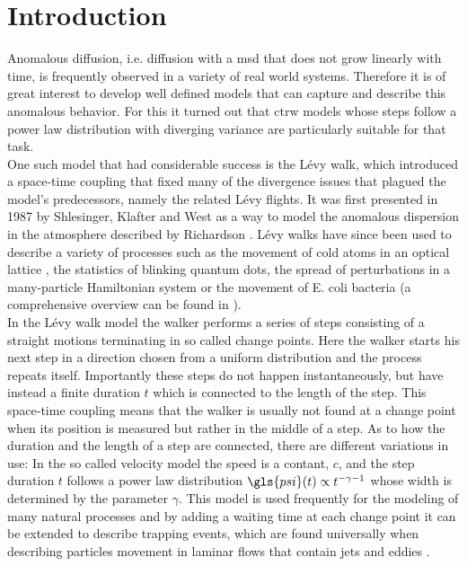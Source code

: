 \chapter{Introduction}

Anomalous diffusion, i.e. diffusion with a \gls{msd} that does not grow linearly with time, is frequently observed in a variety of real world systems. Therefore it is of great interest to develop well defined models that can capture and describe this anomalous behavior. For this it turned out that \gls{ctrw} models whose steps follow a power law distribution with diverging variance are particularly suitable for that task. \\

One such model that had considerable success is the L\'evy walk, which introduced a space-time coupling that fixed many of the divergence issues that plagued the model's predecessors, namely the related L\'evy flights. It was first presented in 1987 by Shlesinger, Klafter and West \cite{shlesinger1987} as a way to model the anomalous dispersion in the atmosphere described by Richardson \cite{richardson}. L\'evy walks have since been used to describe a variety of processes such as the movement of cold atoms in an optical lattice \cite{marksteiner1996},  the statistics of blinking quantum dots, the spread of perturbations in a many-particle Hamiltonian system \cite{zaburdaev2011perturbation} or the movement of E. coli bacteria \cite{korobkova2004} (a comprehensive overview can be found in \cite{lwreview}). \\

In the L\'evy walk model the walker performs a series of steps consisting of a straight motions terminating in so called change points. Here the walker starts his next step in a direction chosen from a uniform distribution and the process repeats itself. Importantly these steps do not happen instantaneously, but have instead a finite duration $t$ which is connected to the length of the step. This space-time coupling means that the walker is usually not found at a change point  when its position is measured but rather in the middle of a step. As to how the duration and the length of a step are connected, there are different variations in use: In the so called velocity model the speed is a contant, $c$, and the step duration $t$ follows a power law distribution $\gls{psi}(t) \propto t^{-\gamma -1 }$ whose width is determined by the parameter $\gamma$. This model is used frequently for the modeling of many natural processes and by adding a waiting time at each change point it can be extended to describe trapping events, which are found universally when describing particles movement in laminar flows that contain jets and eddies \cite{solomon1993,solomon1994,poschke2017}.\\

